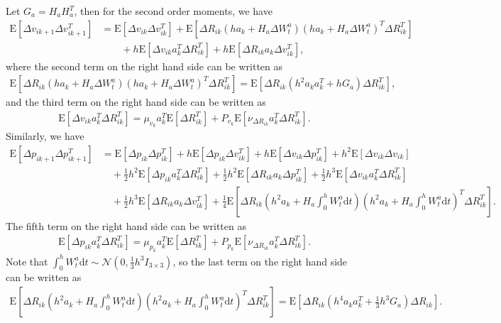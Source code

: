 \documentclass[10pt]{article}
\newcommand{\expect}[1]{\ensuremath{\mathrm{E}\left[ #1 \right]}}
\newcommand{\diff}[1]{\ensuremath{\mathrm{d} #1}}
\begin{document}
Let $G_a = H_aH_a^T$, then for the second order moments, we have
\color{blue}
\begin{align}
	\expect{\Delta v_{ik+1} \Delta v_{ik+1}^T} &= \expect{\Delta v_{ik} \Delta v_{ik}^T} + \expect{\Delta R_{ik}(ha_k+H_a\Delta W_t^a)(ha_k+H_a\Delta W_t^a)^T\Delta R_{ik}^T} \nonumber \\
	&\qquad + h\expect{\Delta v_{ik}a_k^T\Delta R_{ik}^T} + h\expect{\Delta R_{ik}a_k\Delta v_{ik}^T},
\end{align}
\color{black}
where the second term on the right hand side can be written as
\begin{align}
	\expect{\Delta R_{ik}(ha_k+H_a\Delta W_t^a)(ha_k+H_a\Delta W_t^a)^T\Delta R_{ik}^T} = \expect{\Delta R_{ik} (h^2a_ka_k^T + hG_a)\Delta R_{ik}^T},
\end{align}
and the third term on the right hand side can be written as
\begin{align}
	\expect{\Delta v_{ik}a_k^T\Delta R_{ik}^T} = \mu_{v_k}a_k^T\expect{\Delta R_{ik}^T} + P_{v_k}\expect{\nu_{\Delta R_{ik}} a_k^T \Delta R_{ik}^T}.
\end{align}
Similarly, we have
\color{blue}
\begin{align}
	\expect{\Delta p_{ik+1} \Delta p_{ik+1}^T} &= \expect{\Delta p_{ik} \Delta p_{ik}^T} + h\expect{\Delta p_{ik} \Delta v_{ik}^T} + h\expect{\Delta v_{ik} \Delta p_{ik}^T} + h^2\expect{\Delta v_{ik} \Delta v_{ik}} \nonumber \\
	&\quad + \tfrac{1}{2}h^2\expect{\Delta p_{ik}a_k^T\Delta R_{ik}^T} + \tfrac{1}{2}h^2\expect{\Delta R_{ik}a_k\Delta p_{ik}^T} + \tfrac{1}{2}h^3\expect{\Delta v_{ik}a_k^T\Delta R_{ik}^T} \nonumber \\
	&\quad + \tfrac{1}{2}h^3\expect{\Delta R_{ik}a_k\Delta v_{ik}^T} + \tfrac{1}{4}\expect{\Delta R_{ik} \left(h^2a_k + H_a\int_0^h W_t^a\diff{t}\right) \left(h^2a_k + H_a\int_0^h W_t^a\diff{t}\right)^T \Delta R_{ik}^T}.
\end{align}
\color{black}
The fifth term on the right hand side can be written as
\begin{align}
	\expect{\Delta p_{ik}a_k^T\Delta R_{ik}^T} = \mu_{p_k}a_k^T\expect{\Delta R_{ik}^T} + P_{p_k}\expect{\nu_{\Delta R_{ik}}a_k^T\Delta R_{ik}^T}.
\end{align}
Note that $\int_0^h W_t^a\diff{t} \sim \mathcal{N}(0,\tfrac{1}{3}h^3I_{3\times 3})$, so the last term on the right hand side can be written as
\begin{align}
	\expect{\Delta R_{ik} \left(h^2a_k + H_a\int_0^h W_t^a\diff{t}\right) \left(h^2a_k + H_a\int_0^h W_t^a\diff{t}\right)^T \Delta R_{ik}^T} = \expect{\Delta R_{ik} \left(h^4a_ka_k^T + \tfrac{1}{3}h^3G_a\right) \Delta R_{ik}}.
\end{align}
\end{document}
